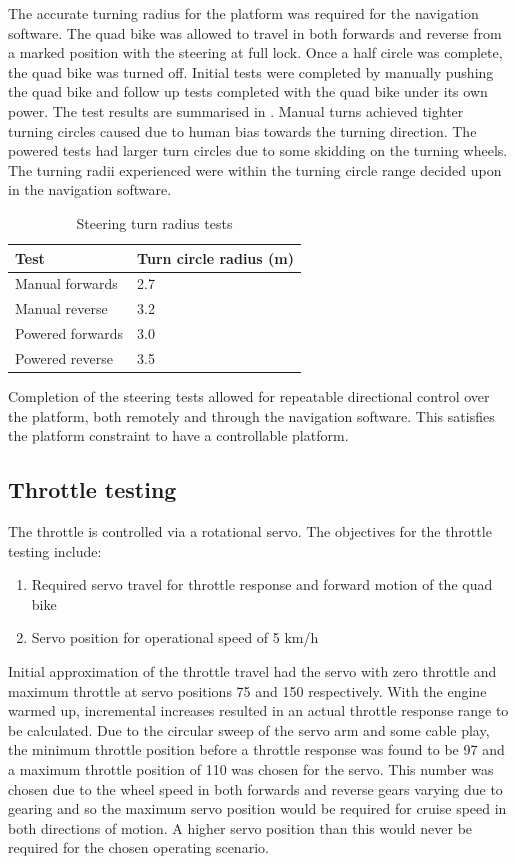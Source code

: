 \documentclass[main.tex]{subfiles}
\begin{document}
The accurate turning radius for the platform was required for the navigation software. The quad bike was allowed to travel in both forwards and reverse from a marked position with the steering at full lock. Once a half circle was complete, the quad bike was turned off. Initial tests were completed by manually pushing the quad bike and follow up tests completed with the quad bike under its own power. The test results are summarised in . Manual turns achieved tighter turning circles caused due to human bias towards the turning direction. The powered tests had larger turn circles due to some skidding on the turning wheels. The turning radii experienced were within the turning circle range decided upon in the navigation software.
\begin{table}[ht]
\centering
\caption{Steering turn radius tests}
\begin{tabular}{ll}
\toprule
Test & Turn circle radius (m) \\ \midrule
Manual forwards & 2.7 \\
Manual reverse & 3.2 \\
Powered forwards & 3.0 \\
Powered reverse & 3.5 \\ \bottomrule
\end{tabular}
\end{table}
Completion of the steering tests allowed for repeatable directional control over the platform, both remotely and through the navigation software. This satisfies the platform constraint to have a controllable platform.  

\subsection{Throttle testing}
The throttle is controlled via a rotational servo. The objectives for the throttle testing include:
\begin{enumerate}
\item Required servo travel for throttle response and forward motion of the quad bike
\item Servo position for operational speed of 5 km/h
\end{enumerate}
Initial approximation of the throttle travel had the servo with zero throttle and maximum throttle at servo positions 75 and 150 respectively. With the engine warmed up, incremental increases resulted in an actual throttle response range to be calculated. Due to the circular sweep of the servo arm and some cable play, the minimum throttle position before a throttle response was found to be 97 and a maximum throttle position of 110 was chosen for the servo. This number was chosen due to the wheel speed in both forwards and reverse gears varying due to gearing and so the maximum servo position would be required for cruise speed in both directions of motion. A higher servo position than this would never be required for the chosen operating scenario.
\end{document}
